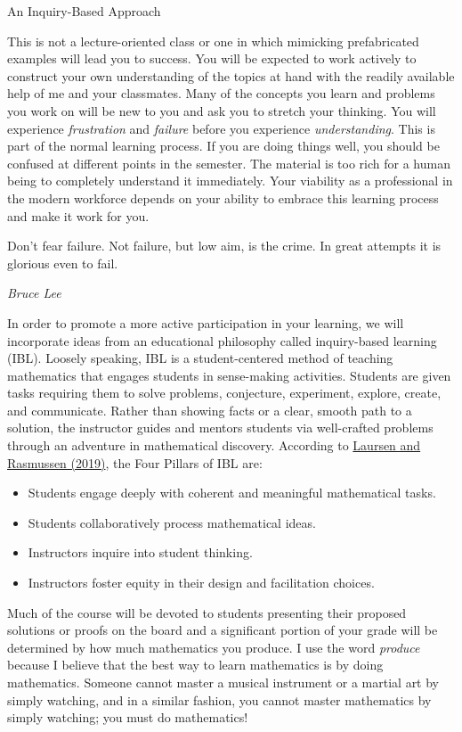 \begin{section}{An Inquiry-Based Approach}

This is not a lecture-oriented class or one in which mimicking prefabricated examples will lead you to success. You will be expected to work actively to construct your own understanding of the topics at hand with the readily available help of me and your classmates. Many of the concepts you learn and problems you work on will be new to you and ask you to stretch your thinking. You will experience \emph{frustration} and \emph{failure} before you experience \emph{understanding}. This is part of the normal learning process. If you are doing things well, you should be confused at different points in the semester. The material is too rich for a human being to completely understand it immediately. Your viability as a professional in the modern workforce depends on your ability to embrace this learning process and make it work for you.

\epigraph{Don't fear failure.  Not failure, but low aim, is the crime. In great attempts it is glorious even to fail.}{\emph{Bruce Lee}}

In order to promote a more active participation in your learning, we will incorporate ideas from an educational philosophy called inquiry-based learning (IBL).  Loosely speaking, IBL is a student-centered method of teaching mathematics that engages students in sense-making activities.  Students are given tasks requiring them to solve problems, conjecture, experiment, explore, create, and communicate.  Rather than showing facts or a clear, smooth path to a solution, the instructor guides and mentors students via well-crafted problems through an adventure in mathematical discovery.  According to \href{https://www.colorado.edu/eer/sites/default/files/attached-files/laursenrasmussencommentaryauthorversion0219.pdf}{Laursen and Rasmussen (2019)}, the Four Pillars of IBL are:
\begin{itemize}
\item Students engage deeply with coherent and meaningful mathematical tasks.
\item Students collaboratively process mathematical ideas.
\item Instructors inquire into student thinking.
\item Instructors foster equity in their design and facilitation choices.
\end{itemize}

Much of the course will be devoted to students presenting their proposed solutions or proofs on the board and a significant portion of your grade will be determined by how much mathematics you produce.  I use the word \emph{produce} because I believe that the best way to learn mathematics is by doing mathematics.  Someone cannot master a musical instrument or a martial art by simply watching, and in a similar fashion, you cannot master mathematics by simply watching; you must do mathematics!


\end{section}
